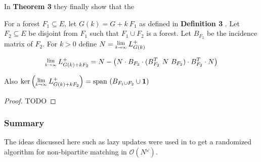 In \textbf{Theorem 3} they finally show that the 

\begin{HXt}
 For a forest $F_1 \subseteq E$, let $G(k) = G + k \ F_1$ as defined in \textbf{Definition 3} . Let $F_2 \subseteq E$ be disjoint from $F_1$ such that $F_1 \cup F_2$ is a forest. Let $B_{F_2}$ be the incidence matrix of $F_2$. For $k > 0$ define $N = \Lim{k \to \infty} \laplacian[G(k)]$

 $$ \Lim{k \to \infty} \laplacian[G(k) + kF_2] = N - \left( N \cdot B_{F_2} \cdot (B_{F_2}^T \ N \ B_{F_2}) \cdot B_{F_2}^T \cdot N \right)$$ 

 Also $\text{ker} \left( \Lim{k \to \infty} \laplacian[G(k) + kF_2] \right) = \text{span }(B_{F_1 \cup F_2} \cup \textbf{1})$
 \end{HXt}



\begin{proof}
 TODO
\end{proof}



\subsubsection{Summary}

The ideas discussed here such as lazy updates were used in \citet{10.1137/070684008} to get a randomized algorithm for non-bipartite matching in $\mathcal{O}(N^\omega)$. 






